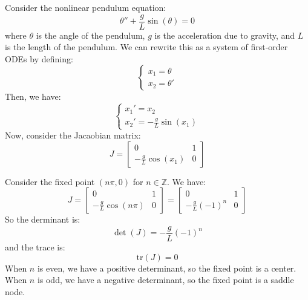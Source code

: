 \documentclass[11pt]{article}
\begin{document}
\begin{example}
    Consider the nonlinear pendulum equation:
    $$\theta'' + \frac{g}{L}\sin(\theta) = 0$$
    where \( \theta \) is the angle of the pendulum, \( g \) is the acceleration due to gravity, and \( L \) is the length of the pendulum. We can rewrite this as a system of first-order ODEs by defining:
    $$\begin{cases}
    x_1 = \theta \\
    x_2 = \theta'
    \end{cases}$$
    Then, we have:
    $$\begin{cases}
    x_1' = x_2 \\
    x_2' = -\frac{g}{L}\sin(x_1)    
    \end{cases}$$
    Now, consider the Jacaobian matrix:
    $$J = \begin{bmatrix}
    0 & 1 \\
    -\frac{g}{L}\cos(x_1) & 0
    \end{bmatrix}$$
    
    Consider the fixed point $(n \pi, 0)$ for \( n \in \mathbb{Z} \). We have:
    $$J = \begin{bmatrix}
    0 & 1 \\
    -\frac{g}{L}\cos(n \pi) & 0
    \end{bmatrix} = \begin{bmatrix}
    0 & 1 \\
    -\frac{g}{L}(-1)^n & 0
    \end{bmatrix}$$
    So the derminant is:
    $$\det(J) = -\frac{g}{L}(-1)^n$$
    and the trace is:
    $$\text{tr}(J) = 0$$
    When $n$ is even, we have a positive determinant, so the fixed point is a center. When $n$ is odd, we have a negative determinant, so the fixed point is a saddle node.
\end{example}
\end{document}

